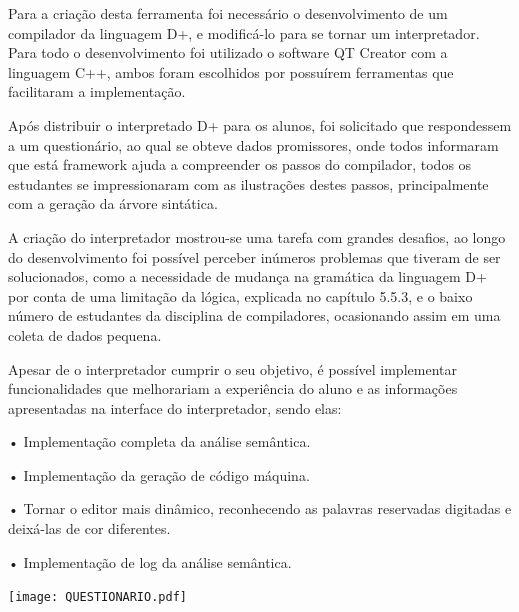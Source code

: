 \documentclass[12pt,oneside,a4paper,chapter=TITLE,section=TITLE,sumario=tradicional]{abntex2}
\begin{document}
Para a criação desta ferramenta foi necessário o desenvolvimento de um compilador da linguagem D+, e modificá-lo para se tornar um interpretador. Para todo o desenvolvimento foi utilizado o software QT Creator com a linguagem C++, ambos foram escolhidos por possuírem ferramentas que facilitaram a implementação.

Após distribuir o interpretado D+ para os alunos, foi solicitado que respondessem a um questionário, ao qual se obteve dados promissores, onde todos informaram que está framework ajuda a compreender os passos do compilador, todos os estudantes se impressionaram com as ilustrações destes passos, principalmente com a geração da árvore sintática.

A criação do interpretador mostrou-se uma tarefa com grandes desafios, ao longo do desenvolvimento foi possível perceber inúmeros problemas que tiveram de ser solucionados, como a necessidade de mudança na gramática da linguagem D+ por conta de uma limitação da lógica, explicada no capítulo 5.5.3, e o baixo número de estudantes da disciplina de compiladores, ocasionando assim em uma coleta de dados pequena.

Apesar de o interpretador cumprir o seu objetivo, é possível implementar funcionalidades que melhorariam a experiência do aluno e as informações apresentadas na interface do interpretador, sendo elas:

•	Implementação completa da análise semântica.

•	Implementação da geração de código máquina.

•	Tornar o editor mais dinâmico, reconhecendo as palavras reservadas digitadas e deixá-las de cor diferentes.

•	Implementação de log da análise semântica.





\texttt{[image: QUESTIONARIO.pdf]}
\end{document}
